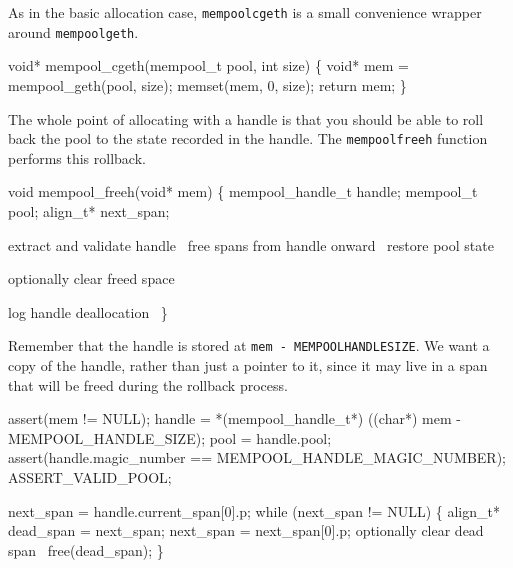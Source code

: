 As in the basic allocation case, {\tt{}mempool{}cgeth} is
a small convenience wrapper around {\tt{}mempool{}geth}.

\nwenddocs{}\plusendmoddef
void* mempool_cgeth(mempool_t pool, int size)
\{
    void* mem = mempool_geth(pool, size);
    memset(mem, 0, size);
    return mem;
\}

\nwendcode{}\nwdocspar

The whole point of allocating with a handle is that you
should be able to roll back the pool to the state recorded
in the handle.  The {\tt{}mempool{}freeh} function performs
this rollback.

\nwenddocs{}\plusendmoddef
void mempool_freeh(void* mem)
\{
    mempool_handle_t handle;
    mempool_t pool;
    align_t* next_span;

    \LA{}extract and validate handle~{\nwtagstyle{}}\RA{}
    \LA{}free spans from handle onward~{\nwtagstyle{}}\RA{}
    \LA{}restore pool state~{\nwtagstyle{}}\RA{}

    \LA{}optionally clear freed space~{\nwtagstyle{}}\RA{}

    \LA{}log handle deallocation~{\nwtagstyle{}}\RA{}
\}

\nwendcode{}\nwdocspar

Remember that the handle is stored at {\tt{}mem\ -\ MEMPOOL{}HANDLE{}SIZE}.
We want a copy of the handle, rather than just a pointer to it,
since it may live in a span that will be freed during the rollback
process.

\nwenddocs{}\endmoddef
assert(mem != NULL);
handle = *(mempool_handle_t*) ((char*) mem - MEMPOOL_HANDLE_SIZE);
pool = handle.pool;
assert(handle.magic_number == MEMPOOL_HANDLE_MAGIC_NUMBER);
ASSERT_VALID_POOL;
\nwendcode{}\nwdocspar

\nwenddocs{}\endmoddef
next_span = handle.current_span[0].p;
while (next_span != NULL) \{
    align_t* dead_span = next_span;
    next_span = next_span[0].p;
    \LA{}optionally clear dead span~{\nwtagstyle{}}\RA{}
    free(dead_span);
\}
\nwendcode{}\nwdocspar


